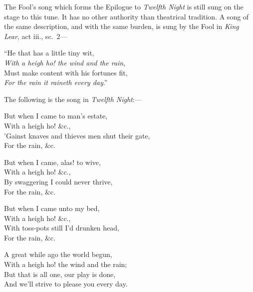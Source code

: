 

The Fool’s song which forms the Epilogue to \textit{Twelfth Night} is still sung on the
stage to this tune. It has no other authority than theatrical tradition. A song
of the same description, and with the same burden, is sung by the Fool in \textit{King
Lear}, act iii., sc.~2—

\vspace{-0.5\baselineskip}

\begin{scverse}\begin{altverse}
“He that has a little tiny wit,\\
\textit{With a heigh ho! the wind and the rain},\\
Must make content with his fortunes fit,\\
\textit{For the rain it raineth every day}.”
\end{altverse}
\end{scverse}

\vspace{-0.5\baselineskip}

The following is the song in \textit{Twelfth Night}:—


\smallskip



\begin{dcverse}\begin{patverse}
But when I came to man’s estate,\\
With a heigh ho! \&c.,\\
’Gainst knaves and thieves men shut their gate,\\
For the rain, \&c.
\end{patverse}

\begin{patverse}
But when I came, alas! to wive,\\
With a heigh ho! \&c.,\\
By swaggering I could never thrive,\\
For the rain, \&c.
\end{patverse}

\begin{patverse}
But when I came unto my bed,\\
With a heigh ho! \&c.,\\
With toss-pots still I’d drunken head,\\
For the rain, \&c.
\end{patverse}

\begin{patverse}
A great while ago the world begun,\\
With a heigh ho! the wind and the rain;\\
But that is all one, our play is done,\\
And we’ll strive to please you every day.
\end{patverse}
\end{dcverse}
\pagebreak


